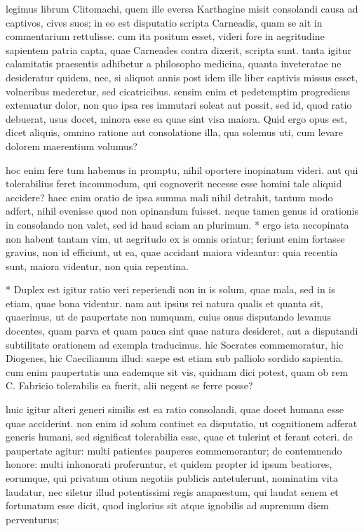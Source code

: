  legimus librum Clitomachi, quem ille eversa Karthagine misit consolandi causa ad captivos, cives suos; in eo est disputatio scripta Carneadis, quam se ait in commentarium rettulisse. cum ita positum esset, videri fore in aegritudine sapientem patria capta, quae Carneades contra dixerit, scripta sunt. tanta igitur calamitatis praesentis adhibetur a philosopho medicina, quanta inveteratae ne desideratur quidem, nec, si aliquot annis post idem ille liber captivis missus esset, volneribus mederetur, sed cicatricibus. sensim enim et pedetemptim progrediens extenuatur dolor, non quo ipsa res immutari soleat aut possit, sed id, quod ratio debuerat, usus docet, minora esse ea quae sint visa maiora. Quid ergo opus est, dicet aliquis, omnino ratione aut consolatione illa, qua solemus uti, cum levare dolorem maerentium volumus?

 hoc enim fere tum habemus in promptu, nihil oportere inopinatum videri. aut qui tolerabilius feret incommodum, qui cognoverit necesse esse homini tale aliquid accidere? haec enim oratio de ipsa summa mali nihil detrahit, tantum modo adfert, nihil evenisse quod non opinandum fuisset. neque tamen genus id orationis in consolando non valet, sed id haud sciam an plurimum. * ergo ista necopinata non habent tantam vim, ut aegritudo ex is omnis oriatur; feriunt enim fortasse gravius, non id efficiunt, ut ea, quae accidant maiora videantur: quia recentia sunt, maiora videntur, non quia repentina.

 * Duplex est igitur ratio veri reperiendi non in is solum, quae mala, sed in is etiam, quae bona videntur. nam aut ipsius rei natura qualis et quanta sit, quaerimus, ut de paupertate non numquam, cuius onus disputando levamus docentes, quam parva et quam pauca sint quae natura desideret, aut a disputandi subtilitate orationem ad exempla traducimus. hic Socrates commemoratur, hic Diogenes, hic Caecilianum illud: saepe est etiam sub palliolo sordido sapientia. cum enim paupertatis una eademque sit vis, quidnam dici potest, quam ob rem C. Fabricio tolerabilis ea fuerit, alii negent se ferre posse?

 huic igitur alteri generi similis est ea ratio consolandi, quae docet humana esse quae acciderint. non enim id solum continet ea disputatio, ut cognitionem adferat generis humani, sed significat tolerabilia esse, quae et tulerint et ferant ceteri. de paupertate agitur: multi patientes pauperes commemorantur; de contemnendo honore: multi inhonorati proferuntur, et quidem propter id ipsum beatiores, eorumque, qui privatum otium negotiis publicis antetulerunt, nominatim vita laudatur, nec siletur illud potentissimi regis anapaestum, qui laudat senem et fortunatum esse dicit, quod inglorius sit atque ignobilis ad supremum diem perventurus;

